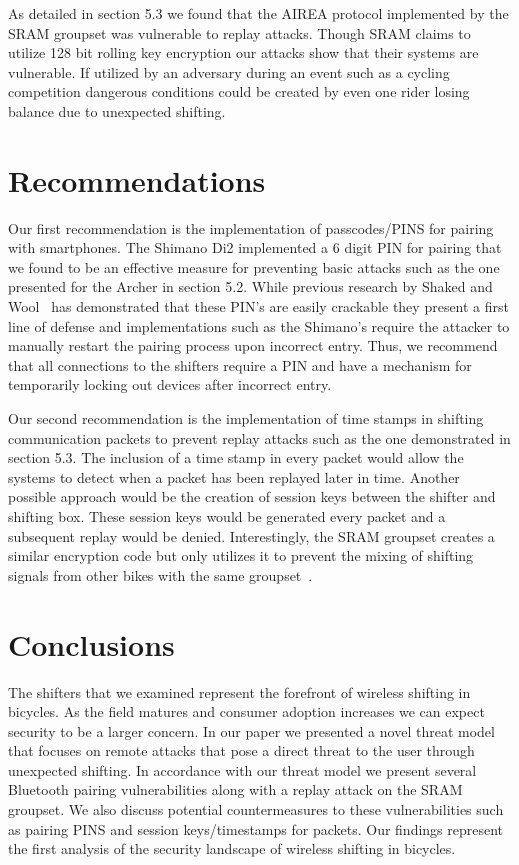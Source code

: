 \documentclass[letterpaper,twocolumn,10pt]{article}
\begin{document}
As detailed in section 5.3 we found that the AIREA protocol implemented by the SRAM groupset was vulnerable to replay attacks. Though SRAM claims to utilize 128 bit rolling key encryption our attacks show that their systems are vulnerable. If utilized by an adversary during an event such as a cycling competition dangerous conditions could be created by even one rider losing balance due to unexpected shifting.


\section{Recommendations}

Our first recommendation is the implementation of passcodes/PINS for pairing with smartphones. The Shimano Di2 implemented a 6 digit PIN for pairing that we found to be an effective measure for preventing basic attacks such as the one presented for the Archer in section 5.2. While previous research by Shaked and Wool~\cite{bluepin} has demonstrated that these PIN’s are easily crackable they present a first line of defense and implementations such as the Shimano’s require the attacker to manually restart the pairing process upon incorrect entry. Thus, we recommend that all connections to the shifters require a PIN and have a mechanism for temporarily locking out devices after incorrect entry. 

Our second recommendation is the implementation of time stamps in shifting communication packets to prevent replay attacks such as the one demonstrated in section 5.3. The inclusion of a time stamp in every packet would allow the systems to detect when a packet has been replayed later in time. Another possible approach would be the creation of session keys between the shifter and shifting box. These session keys would be generated every packet and a subsequent replay would be denied. Interestingly, the SRAM groupset creates a similar encryption code but only utilizes it to prevent the mixing of shifting signals from other bikes with the same groupset~\cite{etapsecure}.


\section{Conclusions}

The shifters that we examined represent the forefront of wireless shifting in bicycles. As the field matures and consumer adoption increases we can expect security to be a larger concern. 
In our paper we presented a novel threat model that focuses on remote attacks that pose a direct threat to the user through unexpected shifting. In accordance with our threat model we present several Bluetooth pairing vulnerabilities along with a replay attack on the SRAM groupset. We also discuss potential countermeasures to these vulnerabilities such as pairing PINS and session keys/timestamps for packets. Our findings represent the first analysis of the security landscape of wireless shifting in bicycles.  
\end{document}
